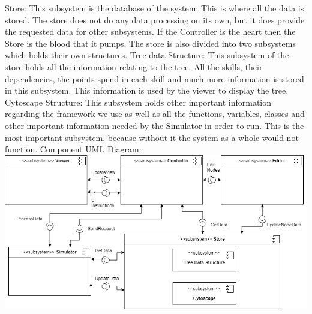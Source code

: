 \documentclass{article}
\begin{document}
  Store:\newline
  This subsystem is the database of the system. This is where all the data is stored. The store does not do any data processing on its own, but it does provide the requested data for other subsystems. If the Controller is the heart then the Store is the blood that it pumps. The store is also divided into two subsystems which holds their own structures.\newline
  Tree data Structure:\newline 
  This subsystem of the store holds all the information relating to the tree. All the skills, their dependencies, the points spend in each skill and much more information is stored in this subsystem. This information is used by the viewer to display the tree.\newline
  Cytoscape Structure:\newline 
  This subsystem holds other important information regarding the framework we use as well as all the functions, variables, classes and other important information needed by the Simulator in order to run. This is the most important subsystem, because without it the system as a whole would not function.\newline \newline 
  Component UML Diagram:
  \includegraphics{TriiUMLComponentDiagram}
\end{document}

